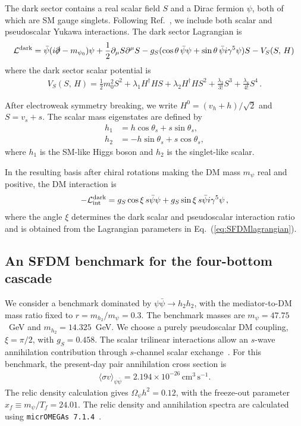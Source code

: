 \documentclass[superscriptaddress,
showpacs,preprintnumbers,nofootinbib,eqsecnum,amsmath,amssymb,aps,11pt, groupedaddress, floatfix]{revtex4-2}
\begin{document}
The dark sector contains a real scalar field $S$ and a
Dirac fermion $\psi$, both of which are SM gauge singlets.
Following Ref.~\cite{Kim:2016csm}, we include both scalar
and pseudoscalar Yukawa interactions.
The dark sector Lagrangian is
\begin{align}
     \mathcal L^{\rm dark} = \bar\psi (i \slashed{\partial}
   - m_{\psi_0}) \psi + \frac{1}{2} \partial_\mu S \partial^\mu S  - g_S
  (\cos\theta \,\bar\psi \psi + \sin\theta \,\bar\psi i \gamma^5 \psi) S
  - V_S (S, \, H)\,
  \label{eq:SFDMlagrangian}
\end{align}
where the dark sector scalar potential is
\begin{align}
  V_S (S, \, H) = \frac12 m_0^2 S^2 + \lambda_1 H^\dagger H S +
  \lambda_2 H^\dagger H S^2 + \frac{\lambda_3}{3!} S^3 +
  \frac{\lambda_4}{4!} S^4 \,.
\end{align}

After electroweak symmetry breaking, we write $H^0=(v_h+h)/\sqrt{2}$ and $S=v_s+s$.
The scalar mass eigenstates are defined by
\begin{align}
h_1 &= h\cos\theta_s + s\sin\theta_s, \\
h_2 &= -h\sin\theta_s + s\cos\theta_s,
\end{align}
where $h_1$ is the SM-like Higgs boson and $h_2$ is
the singlet-like scalar.

In the resulting basis after chiral rotations making the DM mass $m_\psi$ real and positive, the DM interaction is
\begin{align}
  -\mathcal{L}^{\rm dark}_\mathrm{int} = g_S \cos\xi \,s \bar\psi \psi + g_S \sin\xi \,s
  \bar\psi i \gamma^5 \psi \,,
\end{align}
where the angle $\xi$ determines the dark scalar and pseudoscalar interaction ratio and is obtained from the Lagrangian parameters in Eq.~(\ref{eq:SFDMlagrangian}).



\subsection{An SFDM benchmark for the four-bottom cascade}


We consider a benchmark dominated by
$\psi\bar\psi\to h_2h_2$, with the mediator-to-DM mass ratio fixed to $r=m_{h_2}/m_\psi=0.3$.
The benchmark masses are $m_\psi=47.75$~GeV and $m_{h_2}=14.325$~GeV.
We choose a purely pseudoscalar DM coupling, $\xi=\pi/2$, with $g_S=0.458$.
The scalar trilinear interactions allow an $s$-wave annihilation contribution through $s$-channel scalar exchange~\cite{Kim:2016csm}.
For this benchmark, the present-day pair annihilation cross section is
\begin{align}
\langle\sigma v\rangle_{\psi\bar\psi}
=
2.194\times10^{-26}\,
\mathrm{cm^3\,s^{-1}}.
\end{align}
The relic density calculation gives
$\Omega_\psi h^2=0.12$, with the freeze-out parameter $x_f\equiv m_\psi/T_f=24.01$.
The relic density and annihilation spectra are calculated using \texttt{micrOMEGAs 7.1.4}~\cite{Belanger:2026asz}.
\end{document}
